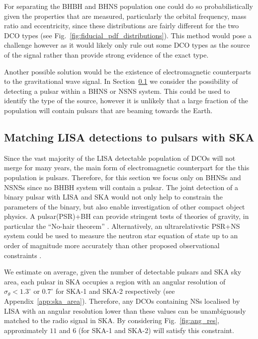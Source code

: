 For separating the BHBH and BHNS population one could do so probabilistically given the properties that are measured, particularly the orbital frequency, mass ratio and eccentricity, since these distributions are fairly different for the two DCO types (see Fig.~\ref{fig:fiducial_pdf_distributions}). This method would pose a challenge however as it would likely only rule out some DCO types as the source of the signal rather than provide strong evidence of the exact type.

Another possible solution would be the existence of electromagnetic counterparts to the gravitational wave signal. In Section~\ref{sec:pulsar_matching} we consider the possibility of detecting a pulsar within a BHNS or NSNS system. This could be used to identify the type of the source, however it is unlikely that a large fraction of the population will contain pulsars that are beaming towards the Earth.

\subsection{Matching LISA detections to pulsars with SKA}\label{sec:pulsar_matching}
Since the vast majority of the LISA detectable population of DCOs will not merge for many years, the main form of electromagnetic counterpart for the this population is pulsars. Therefore, for this section we focus only on BHNSs and NSNSs since no BHBH system will contain a pulsar. The joint detection of a binary pulsar with LISA and SKA would not only help to constrain the parameters of the binary, but also enable investigation of other compact object physics. A pulsar(PSR)+BH can provide stringent tests of theories of gravity, in particular the ``No-hair theorem'' \citep{Keane+2015}. Alternatively, an ultrarelativstic PSR+NS system could be used to measure the neutron star equation of state up to an order of magnitude more accurately than other proposed observational constraints \citep{Kyutoku+2019, Thrane+2020}.

We estimate on average, given the number of detectable pulsars and SKA sky area, each pulsar in SKA occupies a region with an angular resolution of $\sigma_{\theta} < 1.3^\circ$ or $0.7^\circ$ for SKA-1 and SKA-2 respectively (see Appendix~\ref{app:ska_area}). Therefore, any DCOs containing NSs localised by LISA with an angular resolution lower than these values can be unambiguously matched to the radio signal in SKA. By considering Fig.~\ref{fig:ang_res}, approximately $11$ and $6$ (for SKA-1 and SKA-2) will satisfy this constraint.

